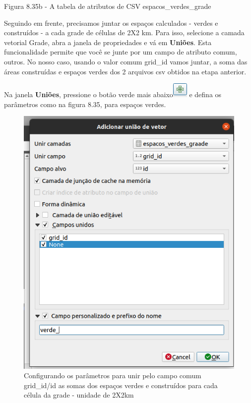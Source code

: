 \documentclass[
]{book}
\begin{document}
Figura 8.35b - A tabela de atributos de CSV espacos\_verdes\_grade

Seguindo em frente, precisamos juntar os espaços calculados - verdes e construídos - a cada grade de células de 2X2 km. Para isso, selecione a camada vetorial Grade, abra a janela de propriedades e vá em \textbf{Uniões}. Esta funcionalidade permite que você se junte por um campo de atributo comum, outros. No nosso caso, usando o valor comum grid\_id vamos juntar, a soma das áreas construídas e espaços verdes dos 2 arquivos csv obtidos na etapa anterior.

Na janela \textbf{Uniões}, pressione o botão verde mais abaixo\includegraphics{media/modulo8/add_join_btn.png} e defina os parâmetros como na figura 8.35, para espaços verdes.

\begin{figure}
\centering
\includegraphics{media/modulo8/fig835_c.png}
\caption{Configurando os parâmetros para unir pelo campo comum grid\_id/id as somas dos espaços verdes e construídos para cada célula da grade - unidade de 2X2km}
\end{figure}
\end{document}
